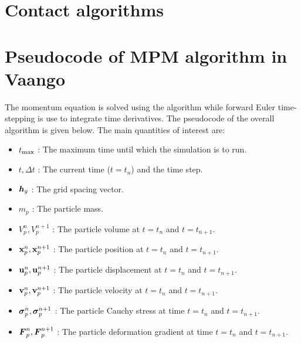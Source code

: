 \section{Contact algorithms}


\section{Pseudocode of MPM algorithm in Vaango}
The momentum equation is solved using the \MPM algorithm while forward Euler time-stepping
is use to integrate time derivatives.  The pseudocode of the overall algorithm is given below.
The main quantities of interest are:
\begin{itemize} 
  \setlength\itemsep{1pt}
  \item $t_{\text{max}}$ : {\Ochre The maximum time until which the simulation is to run.}
  \item $t, \Delta t$ : {\Ochre The current time ($t = t_n$) and the time step.}
  \item $\boldsymbol{h}_g$ : {\Ochre The grid spacing vector.}
  \item $m_p$ : {\Ochre The particle mass.}
  \item $V_p^n, V_p^{n+1}$ : {\Ochre The particle volume at $t = t_n$ and $t = t_{n+1}$.}
  \item $\mathbf{x}_p^n, \mathbf{x}_p^{n+1}$ : {\Ochre The particle position at $t = t_n$ and $t = t_{n+1}$.}
  \item $\mathbf{u}_p^n, \mathbf{u}_p^{n+1}$ : {\Ochre The particle displacement at $t = t_n$ and $t = t_{n+1}$.}
  \item $\mathbf{v}_p^n, \mathbf{v}_p^{n+1}$ : {\Ochre The particle velocity at $t = t_n$ and $t = t_{n+1}$.}
  \item $\boldsymbol{\sigma}_p^n, \boldsymbol{\sigma}_p^{n+1}$ : {\Ochre The particle Cauchy stress at time $t = t_n$ and $t = t_{n+1}$.}
  \item $\boldsymbol{F}_p^n, \boldsymbol{F}_p^{n+1}$ : {\Ochre The particle deformation gradient at time $t = t_n$ and $t = t_{n+1}$.}
\end{itemize}

